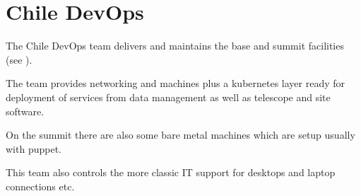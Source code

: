 \section{Chile DevOps} \label{sec:devops}

The Chile DevOps team delivers and maintains the base and summit facilities (see ).

The team provides networking and machines plus a kubernetes layer ready for deployment of services from data management as well as telescope and site software.

On the summit there are also some bare metal machines which are setup usually with puppet.

This team also controls the more classic IT support for desktops and laptop connections etc.

